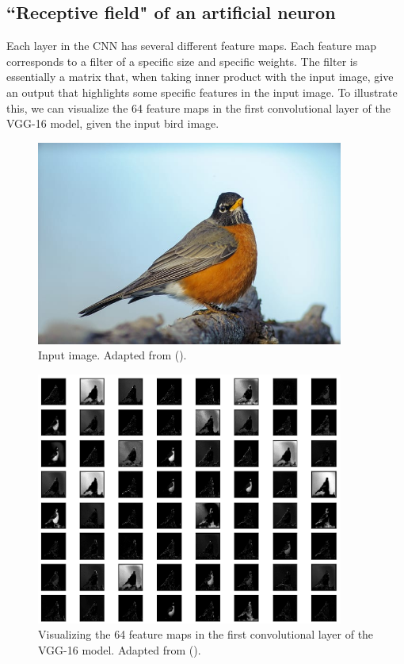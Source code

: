 \subsection{``Receptive field" of an artificial neuron}
Each layer in the CNN has several different feature maps. Each feature map corresponds to a filter of a specific size and specific weights. The filter is essentially a matrix that, when taking inner product with the input image, give an output that highlights some specific features in the input image. To illustrate this, we can visualize the 64 feature maps in the first convolutional layer of the VGG-16 model, given the input bird image.
\begin{figure}[H]
        \centering
            \includegraphics[width=0.9\textwidth]{figures/artificial/bird.jpg}
            \caption{Input image. Adapted from (\cite{feature_map}).}
    \end{figure}
\begin{figure}[H]
        \centering
            \includegraphics[width=0.9\textwidth]{figures/artificial/feature_map_vgg16.png}
            \caption{Visualizing the 64 feature maps in the first convolutional layer of the VGG-16 model. Adapted from (\cite{feature_map}).}
    \end{figure}
    
